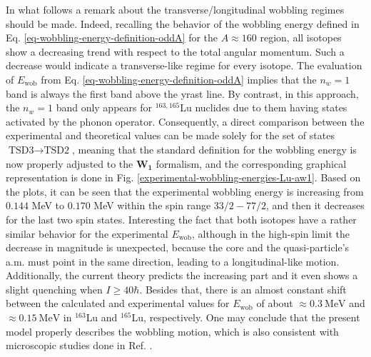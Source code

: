In what follows a remark about the transverse/longitudinal wobbling regimes should be made. Indeed, recalling the behavior of the wobbling energy defined in Eq. \ref{eq-wobbling-energy-definition-oddA} for the $A\approx160$ region, all isotopes show a decreasing trend with respect to the total angular momentum. Such a decrease would indicate a transverse-like regime for every isotope. The evaluation of $E_\text{wob}$ from Eq. \ref{eq-wobbling-energy-definition-oddA} implies that the $n_w=1$ band is always the first band above the yrast line. By contrast, in this approach, the $n_w=1$ band only appears for $^{163,165}$Lu nuclides due to them having states activated by the phonon operator. Consequently, a direct comparison between the experimental and theoretical values can be made solely for the set of states $\text{TSD3}\to\text{TSD2}$, meaning that the standard definition for the wobbling energy is now properly adjusted to the $\mathbf{W_1}$ formalism, and the corresponding graphical representation is done in Fig. \ref{experimental-wobbling-energies-Lu-aw1}. Based on the plots, it can be seen that the experimental wobbling energy is increasing from $0.144$ MeV to $0.170$ MeV within the spin range $33/2 - 77/2$, and then it decreases for the last two spin states. Interesting the fact that both isotopes have a rather similar behavior for the experimental $E_\text{wob}$, although in the high-spin limit the decrease in magnitude is unexpected, because the core and the quasi-particle's a.m. must point in the same direction, leading to a longitudinal-like motion. Additionally, the current theory predicts the increasing part and it even shows a slight quenching when $I\geq 40\hbar$. Besides that, there is an almost constant shift between the calculated and experimental values for $E_\text{wob}$ of about $\approx 0.3\ \text{MeV}$ and $\approx 0.15\ \text{MeV}$ in $^{163}$Lu and $^{165}$Lu, respectively. One may conclude that the present model properly describes the wobbling motion, which is also consistent with microscopic studies done in Ref. \cite{matsuzaki2002wobbling}.
